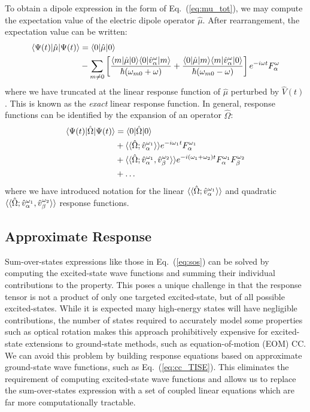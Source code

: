 {{To obtain a dipole expression in the form of Eq.~(\ref{eq:mu_tot}), we may compute the expectation 
value of the electric dipole operator $\hat{\mu}$. After rearrangement, the expectation value
can be written:
\begin{equation} \label{eq:sos}
    \begin{aligned}
    \langle\Psi(t) |\hat\mu| \Psi(t) \rangle &= \langle0 |\hat\mu| 0 \rangle \\ 
    &- \sum_{m\neq0}\left[\frac{\langle m |\hat\mu| 0 \rangle\langle0 |\hat{v}^\omega_\alpha| m \rangle}{\hbar(\omega_{m0}+\omega)}
        + \frac{\langle0 |\hat\mu| m \rangle\langle m |\hat{v}^\omega_\alpha| 0 \rangle}{\hbar(\omega_{m0}-\omega)}\right]
    e^{-i\omega t}F^\omega_\alpha
    \end{aligned}
\end{equation}
where we have truncated at the linear response function of $\hat{\mu}$ perturbed by $\hat{V}(t)$. This is known as the \textit{exact} linear response function. In general, 
response functions can be identified by the expansion of an operator $\hat\Omega$:
\begin{equation}
    \begin{aligned}
    \langle\Psi(t) |\hat\Omega| \Psi(t) \rangle &= \langle0 |\hat\Omega| 0 \rangle \\ 
    &+ \langle\langle\hat\Omega;\hat{v}^{\omega_1}_\alpha\rangle\rangle e^{-i\omega_1 t}F^{\omega_1}_\alpha \\ 
    &+ \langle\langle\hat\Omega;\hat{v}^{\omega_1}_\alpha,\hat{v}^{\omega_2}_\beta\rangle\rangle e^{-i(\omega_1+\omega_2)t}F^{\omega_1}_\alpha F^{\omega_2}_\beta \\
    &+ \ldots
    \end{aligned}
\end{equation}
where we have introduced notation for the linear $\langle\langle\hat\Omega;\hat{v}^{\omega_1}_\alpha\rangle\rangle$ 
and quadratic $\langle\langle\hat\Omega;\hat{v}^{\omega_1}_\alpha,\hat{v}^{\omega_2}_\beta\rangle\rangle$ response functions.

\subsection{Approximate Response} \label{ss:apprx} Sum-over-states expressions
like those in Eq.~(\ref{eq:sos}) can be solved by computing the excited-state
wave functions and summing their individual contributions to the property. This
poses a unique challenge in that the response tensor is not a product of only
one targeted excited-state, but of all possible excited-states. While it is
expected many high-energy states will have negligible contributions, the number
of states required to accurately model some properties such as optical rotation
makes this approach prohibitively expensive for excited-state extensions to
ground-state methods, such as equation-of-motion (EOM) CC.\cite{Wiberg2006}  
We can avoid this
problem by building response equations based on approximate ground-state wave
functions, such as Eq.~(\ref{eq:cc_TISE}). This eliminates the requirement of 
computing excited-state wave functions and allows us to replace the
sum-over-states expression with a set of coupled linear equations which are far
more computationally tractable.\cite{Norman2011,Helgaker2012}

}}
